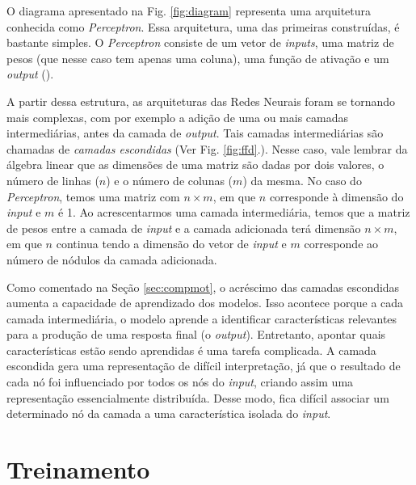 
 O diagrama apresentado na Fig. \ref{fig:diagram} representa uma arquitetura conhecida como \textit{Perceptron}. Essa arquitetura, uma das primeiras construídas, é bastante simples. O \textit{Perceptron} consiste de um vetor de \textit{inputs}, uma matriz de pesos (que nesse caso tem apenas uma coluna), uma função de ativação e um \textit{output} (\cite{Rosenblatt:1957}). 
 
 A partir dessa estrutura, as arquiteturas das Redes Neurais foram se tornando mais complexas, com por exemplo a adição de uma ou mais camadas intermediárias, antes da camada de \textit{output}. Tais camadas intermediárias são chamadas de \textit{camadas escondidas} (Ver Fig. \ref{fig:ffd}.). Nesse caso, vale lembrar da álgebra linear que as dimensões de uma matriz são dadas por dois valores, o número de linhas ($n$) e o número de colunas ($m$) da mesma. No caso do \textit{Perceptron}, temos uma matriz com $n \times m$, em que $n$ corresponde à dimensão do \textit{input} e $m$ é 1. Ao acrescentarmos uma camada intermediária, temos que a matriz de pesos entre a camada de \textit{input} e a camada adicionada terá dimensão $n \times m$, em que $n$ continua tendo a dimensão do vetor de \textit{input} e $m$ corresponde ao número de nódulos da camada adicionada.



Como comentado na Seção \ref{sec:compmot}, o acréscimo das camadas escondidas aumenta a capacidade de aprendizado dos modelos. Isso acontece porque a cada camada intermediária, o modelo aprende a identificar características relevantes para a produção de uma resposta final (o \textit{output}). Entretanto, apontar quais características estão sendo aprendidas é uma tarefa complicada. A camada escondida gera uma representação de difícil interpretação, já que o resultado de cada nó foi influenciado por todos os nós do \textit{input}, criando assim uma representação essencialmente distribuída. Desse modo, fica difícil associar um determinado nó da camada a uma característica isolada do \textit{input}.

\section{Treinamento}

